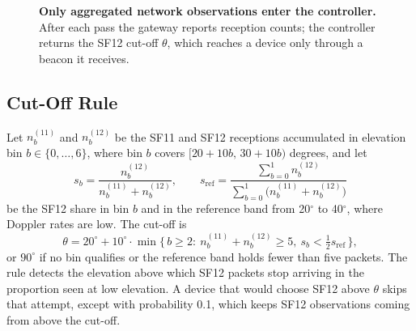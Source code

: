 \documentclass[journal]{IEEEtran}
\begin{document}
\begin{figure}[t]
\centering
{}
\caption{\textbf{Only aggregated network observations enter the controller.} After each pass the gateway reports reception counts; the controller returns the SF12 cut-off $\theta$, which reaches a device only through a beacon it receives.}
\label{fig:loop}
\end{figure}

\subsection{Cut-Off Rule}
Let $n^{(11)}_b$ and $n^{(12)}_b$ be the SF11 and SF12 receptions accumulated in elevation bin $b\in\{0,\dots,6\}$, where bin $b$ covers $[20+10b,\,30+10b)$ degrees, and let
\begin{equation}
s_b=\frac{n^{(12)}_b}{n^{(11)}_b+n^{(12)}_b},\qquad
s_{\mathrm{ref}}=\frac{\sum_{b=0}^{1}n^{(12)}_b}{\sum_{b=0}^{1}\bigl(n^{(11)}_b+n^{(12)}_b\bigr)}
\end{equation}
be the SF12 share in bin $b$ and in the reference band from 20$^\circ$ to 40$^\circ$, where Doppler rates are low. The cut-off is
\begin{equation}\label{eq:cutoff}
\theta=20^\circ+10^\circ\cdot\min\{\,b\ge2:\ n^{(11)}_b+n^{(12)}_b\ge5,\ s_b<\tfrac12 s_{\mathrm{ref}}\,\},
\end{equation}
or $90^\circ$ if no bin qualifies or the reference band holds fewer than five packets. The rule detects the elevation above which SF12 packets stop arriving in the proportion seen at low elevation. A device that would choose SF12 above $\theta$ skips that attempt, except with probability 0.1, which keeps SF12 observations coming from above the cut-off.
\end{document}
